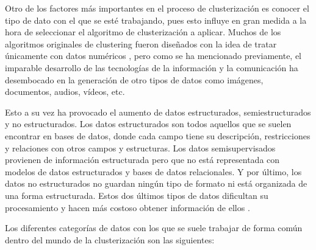\documentclass[10pt, a4paper]{article}
\begin{document}
Otro de los factores más importantes en el proceso de clusterización es conocer el tipo de dato con el que se esté trabajando, pues esto influye en gran medida a la hora de seleccionar el algoritmo de clusterización a aplicar. Muchos de los algoritmos originales de clustering fueron diseñados con la idea de tratar únicamente con datos numéricos \cite{otrolibro}, pero como se ha mencionado previamente, el imparable desarrollo de las tecnologías de la información y la comunicación ha desembocado en la generación de otro tipos de datos como imágenes, documentos, audios, vídeos, etc. 

Esto a su vez ha provocado el aumento de datos estructurados, semiestructurados y no estructurados. Los datos estructurados son todos aquellos que se suelen encontrar en bases de datos, donde cada campo tiene su descripción, restricciones y relaciones con otros campos y estructuras. Los datos semisupervisados provienen de información estructurada pero que no está representada con modelos de datos estructurados y bases de datos relacionales. Y por último, los datos no estructurados no guardan ningún tipo de formato ni está organizada de una forma estructurada. Estos dos últimos tipos de datos dificultan su procesamiento y hacen más costoso obtener información de ellos \cite{articulo14}.

Los diferentes categorías de datos con los que se suele trabajar de forma común dentro del mundo de la clusterización son las siguientes:
\end{document}
